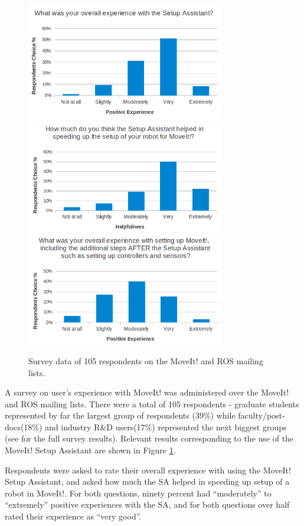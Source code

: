 \documentclass[10pt,journal,compsoc]{joser1}
\begin{document}
{\begin{figure}[!t]
\centering
\includegraphics[width=3.4in]{images/setup_assistant_positive}
\includegraphics[width=3.4in]{images/sa_speedup}
\includegraphics[width=3.4in]{images/moveit_after_sa}
\caption{Survey data of 105 respondents on the MoveIt! and ROS mailing lists.}
\label{fig:setup_assistant_positive}
\end{figure} 

A survey on user's experience with MoveIt! was administered over the MoveIt! and ROS mailing lists. There were a total of 105 respondents - graduate students represented by far the largest group of respondents (39\%) while faculty/post-docs(18\%) and industry R\&D users(17\%) represented the next biggest groups (see \cite{moveit} for the full survey results). Relevant results corresponding to the use of the MoveIt! Setup Assistant are shown in Figure \ref{fig:setup_assistant_positive}. 

Respondents were asked to rate their overall experience with using the MoveIt! Setup Assistant, and asked how much the SA helped in speeding up setup of a robot in MoveIt!. For both questions, ninety percent had ``moderately'' to ``extremely'' positive experiences with the SA, and for both questions over half rated their experience as ``very good''. 

}
\end{document}
